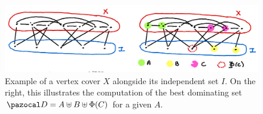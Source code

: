 \begin{figure}
    \includegraphics[width=\textwidth]{figures/domset-vc.png}
    \caption{Example of a vertex cover $X$ alongside its independent set $I$. On the right, this illustrates the computation of the best dominating set $\D = A \uplus B \uplus \Phi(C)$ for a given $A$.}
    \label{fig:domset-vc}
\end{figure}